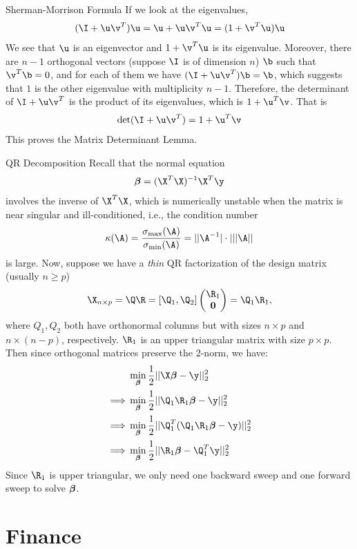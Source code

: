 \documentclass[oldfontcommands]{memoir}
\begin{document}
{\begin{answer}{Sherman-Morrison Formula}
If we look at the eigenvalues,
\begin{align*}
    (\I + \u\v^T)\u = \u + \u\v^T\u = (1 + \v^T\u)\u
\end{align*}
We see that $\u$ is an eigenvector and $1 + \v^T\u$ is its eigenvalue. Moreover, there are $n-1$ orthogonal vectors (suppose $\I$ is of dimension $n$) $\b$ such that $\v^T\b = 0$, and for each of them we have $(\I + \u\v^T)\b = \b$, which suggests that $1$ is the other eigenvalue with multiplicity $n-1$. Therefore, the determinant of $\I + \u\v^T$ is the product of its eigenvalues, which is $1 + \u^T\v$. That is
\begin{align*}
    \det(\I + \u\v^T) = 1 + \u^T\v
\end{align*}
This proves the Matrix Determinant Lemma.\end{answer}
\begin{answer}{QR Decomposition}
Recall that the normal equation 
\begin{align*}
    \bbeta = (\X^T\X)^{-1} \X^T \y
\end{align*}
involves the inverse of $\X^T\X$, which is numerically unstable when the matrix is near singular and ill-conditioned, i.e., the condition number $$\kappa(\A) = \frac{\sigma_{\max}(\A)}{\sigma_{\min}(\A)} = ||\A^{-1}| \cdot |||\A||$$ is large. Now, suppose we have a \emph{thin} QR factorization of the design matrix (usually $n \ge p$) $$\X_{n \times p} = \Q\R = [\Q_1, \Q_2]\begin{pmatrix}\R_1\\ \bZero\end{pmatrix} = \Q_1\R_1,$$ where $Q_1, Q_2$ both have orthonormal columns but with sizes $n \times p$ and $n \times (n-p)$, respectively. $\R_1$ is an upper triangular matrix with size $p \times p$.  Then since orthogonal matrices preserve the 2-norm, we have:
\begin{align*}
    &\min_\bbeta \frac12||\X\bbeta - \y||_2^2 \\
    \implies & \min_\bbeta \frac12||\Q_1\R_1\bbeta - \y||_2^2\\
    \implies & \min_\bbeta \frac12||\Q_1^T(\Q_1\R_1\bbeta - \y)||_2^2\\
    \implies & \min_\bbeta \frac12||\R_1\bbeta - \Q_1^T\y||_2^2\\		
\end{align*}
Since $\R_1$ is upper triangular, we only need one backward sweep and one forward sweep to solve ${\boldsymbol{\beta}}$.
\end{answer}
\part{Finance}
}
\end{document}
